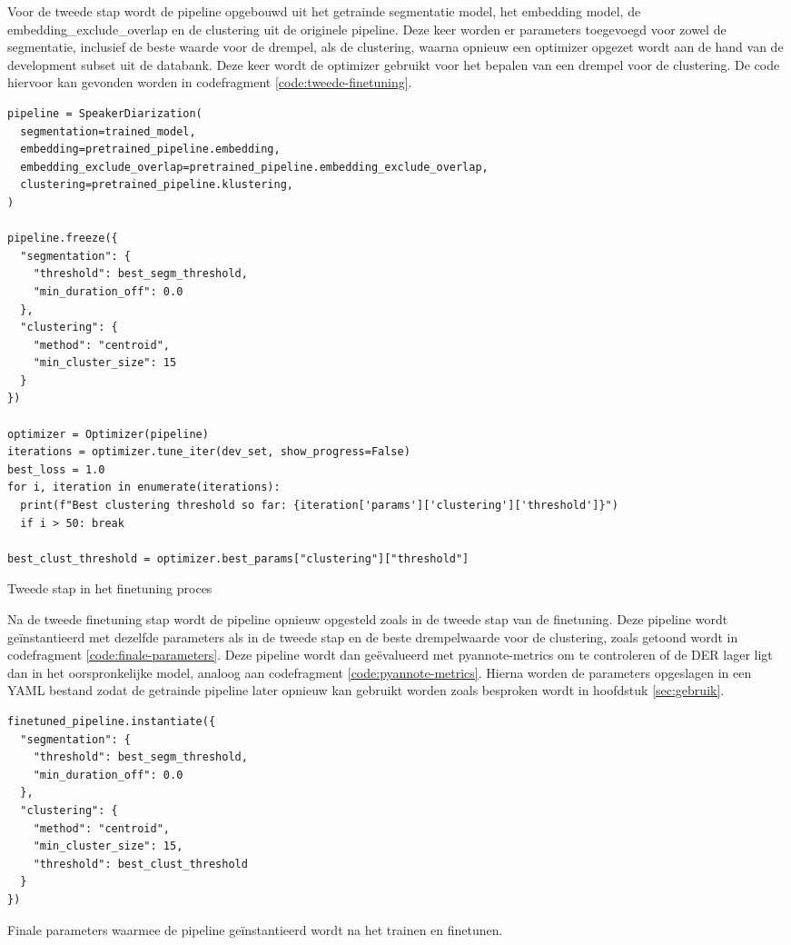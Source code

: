 Voor de tweede stap wordt de pipeline opgebouwd uit het getrainde segmentatie model, het embedding model, de embedding\_exclude\_overlap en de clustering uit de originele pipeline. Deze keer worden er parameters toegevoegd voor zowel de segmentatie, inclusief de beste waarde voor de drempel, als de clustering, waarna opnieuw een optimizer opgezet wordt aan de hand van de development subset uit de databank. Deze keer wordt de optimizer gebruikt voor het bepalen van een drempel voor de clustering. De code hiervoor kan gevonden worden in codefragment \ref{code:tweede-finetuning}.

\begin{listing}
	\begin{verbatim}
pipeline = SpeakerDiarization(
  segmentation=trained_model,
  embedding=pretrained_pipeline.embedding,
  embedding_exclude_overlap=pretrained_pipeline.embedding_exclude_overlap,
  clustering=pretrained_pipeline.klustering,
)

pipeline.freeze({
  "segmentation": {
    "threshold": best_segm_threshold,
    "min_duration_off": 0.0
  },
  "clustering": {
    "method": "centroid",
    "min_cluster_size": 15
  }
})

optimizer = Optimizer(pipeline)
iterations = optimizer.tune_iter(dev_set, show_progress=False)
best_loss = 1.0
for i, iteration in enumerate(iterations):
  print(f"Best clustering threshold so far: {iteration['params']['clustering']['threshold']}")
  if i > 50: break
  
best_clust_threshold = optimizer.best_params["clustering"]["threshold"]
	\end{verbatim}
	\caption[Set-up voor tweede finetuning]{\label{code:tweede-finetuning}Tweede stap in het finetuning proces}
\end{listing}

Na de tweede finetuning stap wordt de pipeline opnieuw opgesteld zoals in de tweede stap van de finetuning. Deze pipeline wordt geïnstantieerd met dezelfde parameters als in de tweede stap en de beste drempelwaarde voor de clustering, zoals getoond wordt in codefragment \ref{code:finale-parameters}. Deze pipeline wordt dan geëvalueerd met pyannote-metrics om te controleren of de DER lager ligt dan in het oorspronkelijke model, analoog aan codefragment \ref{code:pyannote-metrics}. Hierna worden de parameters opgeslagen in een YAML bestand zodat de getrainde pipeline later opnieuw kan gebruikt worden zoals besproken wordt in hoofdstuk \ref{sec:gebruik}.

\begin{listing}
	\begin{verbatim}
finetuned_pipeline.instantiate({
  "segmentation": {
    "threshold": best_segm_threshold,
    "min_duration_off": 0.0
  },
  "clustering": {
    "method": "centroid",
    "min_cluster_size": 15,
    "threshold": best_clust_threshold
  }
})
	\end{verbatim}
	\caption[Finale parameters]{\label{code:finale-parameters}Finale parameters waarmee de pipeline geïnstantieerd wordt na het trainen en finetunen.}
\end{listing}

